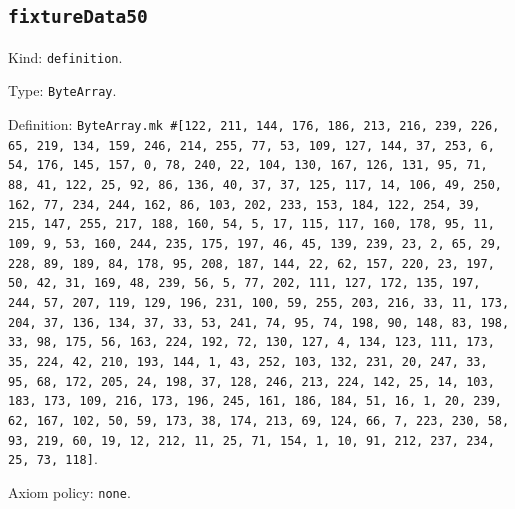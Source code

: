 \documentclass[11pt]{article}
\begin{document}
\subsection*{\texttt{fixtureData50}}
\noindent Kind: \texttt{definition}.\par
\noindent Type: \texttt{ByteArray}.\par
\noindent Definition: \texttt{ByteArray.mk \#[122, 211, 144, 176, 186, 213, 216, 239, 226, 65, 219, 134, 159, 246, 214, 255, 77, 53, 109, 127, 144, 37, 253, 6, 54, 176, 145, 157, 0, 78, 240, 22, 104, 130, 167, 126, 131, 95, 71, 88, 41, 122, 25, 92, 86, 136, 40, 37, 37, 125, 117, 14, 106, 49, 250, 162, 77, 234, 244, 162, 86, 103, 202, 233, 153, 184, 122, 254, 39, 215, 147, 255, 217, 188, 160, 54, 5, 17, 115, 117, 160, 178, 95, 11, 109, 9, 53, 160, 244, 235, 175, 197, 46, 45, 139, 239, 23, 2, 65, 29, 228, 89, 189, 84, 178, 95, 208, 187, 144, 22, 62, 157, 220, 23, 197, 50, 42, 31, 169, 48, 239, 56, 5, 77, 202, 111, 127, 172, 135, 197, 244, 57, 207, 119, 129, 196, 231, 100, 59, 255, 203, 216, 33, 11, 173, 204, 37, 136, 134, 37, 33, 53, 241, 74, 95, 74, 198, 90, 148, 83, 198, 33, 98, 175, 56, 163, 224, 192, 72, 130, 127, 4, 134, 123, 111, 173, 35, 224, 42, 210, 193, 144, 1, 43, 252, 103, 132, 231, 20, 247, 33, 95, 68, 172, 205, 24, 198, 37, 128, 246, 213, 224, 142, 25, 14, 103, 183, 173, 109, 216, 173, 196, 245, 161, 186, 184, 51, 16, 1, 20, 239, 62, 167, 102, 50, 59, 173, 38, 174, 213, 69, 124, 66, 7, 223, 230, 58, 93, 219, 60, 19, 12, 212, 11, 25, 71, 154, 1, 10, 91, 212, 237, 234, 25, 73, 118]}.\par
\noindent Axiom policy: \texttt{none}.\par
\end{document}

